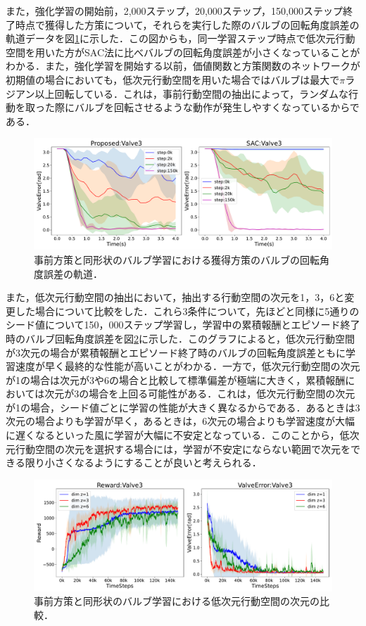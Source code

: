 \documentclass[dvipdfmx]{ampbt_nomag}
\begin{document}
また，強化学習の開始前，2,000ステップ，20,000ステップ，150,000ステップ終了時点で獲得した方策について，それらを実行した際のバルブの回転角度誤差の軌道データを図\ref{ValveTrajectory_Valve3_Sim}に示した．この図からも，同一学習ステップ時点で低次元行動空間を用いた方がSAC法に比べバルブの回転角度誤差が小さくなっていることがわかる．また，強化学習を開始する以前，価値関数と方策関数のネットワークが初期値の場合においても，低次元行動空間を用いた場合ではバルブは最大で$\pi$ラジアン以上回転している．これは，事前行動空間の抽出によって，ランダムな行動を取った際にバルブを回転させるような動作が発生しやすくなっているからである．


\begin{figure}[htbp]
  \centering
  \includegraphics[width=16cm]
       {asset/img/ValveTrajectory_SimTurn180Valve3.pdf}
  \caption{事前方策と同形状のバルブ学習における獲得方策のバルブの回転角度誤差の軌道．}
  \label{ValveTrajectory_Valve3_Sim}
\end{figure}

また，低次元行動空間の抽出において，抽出する行動空間の次元を1，3，6と変更した場合について比較をした．これら3条件について，先ほどと同様に5通りのシード値について150，000ステップ学習し，学習中の累積報酬とエピソード終了時のバルブ回転角度誤差を図\ref{SimValve3LatentDim}に示した．このグラフによると，低次元行動空間が3次元の場合が累積報酬とエピソード終了時のバルブの回転角度誤差ともに学習速度が早く最終的な性能が高いことがわかる．一方で，低次元行動空間の次元が1の場合は次元が3や6の場合と比較して標準偏差が極端に大きく，累積報酬においては次元が3の場合を上回る可能性がある．これは，低次元行動空間の次元が1の場合，シード値ごとに学習の性能が大きく異なるからである．あるときは3次元の場合よりも学習が早く，あるときは，6次元の場合よりも学習速度が大幅に遅くなるといった風に学習が大幅に不安定となっている．このことから，低次元行動空間の次元を選択する場合には，学習が不安定にならない範囲で次元をできる限り小さくなるようにすることが良いと考えられる．

\begin{figure}[h]
  \centering
  \includegraphics[width=16cm]
       {asset/img/SimValve3LatentDim.pdf}
  \caption{事前方策と同形状のバルブ学習における低次元行動空間の次元の比較．}
  \label{SimValve3LatentDim}
\end{figure}
\FloatBarrier
\end{document}

